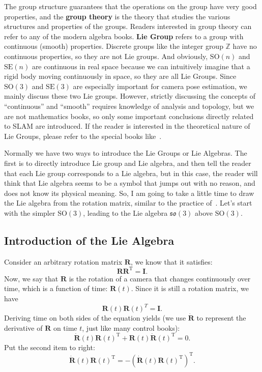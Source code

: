 The group structure guarantees that the operations on the group have very good properties, and the \textbf{group theory} is the theory that studies the various structures and properties of the groups. Readers interested in group theory can refer to any of the modern algebra books. \textbf{Lie Group} refers to a group with continuous (smooth) properties. Discrete groups like the integer group $\mathbb{Z}$ have no continuous properties, so they are not Lie groups. And obviously, $\mathrm{SO}(n)$ and $\mathrm{SE}(n)$ are continuous in real space because we can intuitively imagine that a rigid body moving continuously in space, so they are all Lie Groups. Since $\mathrm{SO}(3)$ and $\mathrm{SE}(3)$ are especially important for camera pose estimation, we mainly discuss these two Lie groups. However, strictly discussing the concepts of ``continuous'' and ``smooth'' requires knowledge of analysis and topology, but we are not mathematics books, so only some important conclusions directly related to SLAM are introduced. If the reader is interested in the theoretical nature of Lie Groups, please refer to the special books like~\cite{Varadarajan2013}.

Normally we have two ways to introduce the Lie Groups or Lie Algebras. The first is to directly introduce Lie group and Lie algebra, and then tell the reader that each Lie group corresponds to a Lie algebra, but in this case, the reader will think that Lie algebra seems to be a symbol that jumps out with no reason, and does not know its physical meaning. So, I am going to take a little time to draw the Lie algebra from the rotation matrix, similar to the practice of~\cite{Ma2012}. Let's start with the simpler $\mathrm{SO}(3)$, leading to the Lie algebra $\mathfrak{so}(3)$ above $\mathrm{SO}(3)$.

\subsection{Introduction of the Lie Algebra}
Consider an arbitrary rotation matrix $\mathbf{R}$, we know that it satisfies:
\begin{equation}
\mathbf{R} \mathbf{R}^\mathrm{T}=\mathbf{I}.
\end{equation}
Now, we say that $\mathbf{R}$ is the rotation of a camera that changes continuously over time, which is a function of time: $\mathbf{R}(t)$. Since it is still a rotation matrix, we have
\[
\mathbf{R}(t) \mathbf{R}(t) ^T = \mathbf{I}.
\]
Deriving time on both sides of the equation yields (we use $\dot{\mathbf{R}}$ to represent the derivative of $\mathbf{R}$ on time $t$, just like many control books):
\[
\dot{\mathbf{R}} (t) \mathbf{R} {(t)^\mathrm{T}} + \mathbf{R} (t) \dot{\mathbf{R}} {(t) ^\mathrm{T}} = 0.
\]
Put the second item to right:
\begin{equation}
\dot{\mathbf{R}} (t) \mathbf{R} {(t)^\mathrm{T}} = - \left( \dot{\mathbf{R}} (t) \mathbf{R} {(t)^\mathrm{T}} \right)^\mathrm{T} .
\end{equation}

